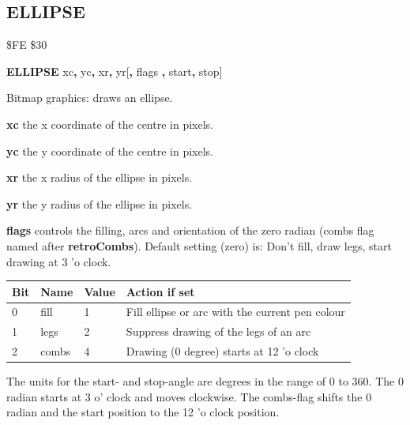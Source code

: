 
\newpage
\subsection{ELLIPSE}
\begin{description}[leftmargin=2cm,style=nextline]
\item [Token:]    \$FE \$30

\item [Format:]   {\bf ELLIPSE} xc{\bf,} yc{\bf,} xr{\bf,} yr[{\bf,} flags {\bf,} start{\bf,} stop]

\item [Usage:]    Bitmap graphics: draws an ellipse.

                  {\bf xc} the x coordinate of the centre in pixels.

                  {\bf yc} the y coordinate of the centre in pixels.

                  {\bf xr} the x radius of the ellipse in pixels.

                  {\bf yr} the y radius of the ellipse in pixels.

                  {\bf flags} controls the filling, arcs and orientation of the zero radian (combs flag named after {\bf retroCombs}). Default setting (zero) is: Don't fill, draw legs, start drawing at 3 'o clock.

                  {\setlength{\tabcolsep}{1.5mm}
                  \begin{tabular}{|l|l|l|l|}
                  \hline
                  {\bf Bit}  & {\bf Name} & {\bf Value} & {\bf Action if set} \\
                  \hline
                  0 & fill  & 1  & Fill ellipse or arc with the current pen colour \\
                  1 & legs  & 2  & Suppress drawing of the legs of an arc \\
                  2 & combs & 4  & Drawing (0 degree) starts at 12 'o clock \\
                  \hline
                  \end{tabular}
                  }

                  The units for the start- and stop-angle are degrees in the range of 0 to 360. The 0 radian starts at 3 o' clock and moves clockwise. The combs-flag shifts the 0 radian and the start position to the 12 'o clock position.


\end{description}
